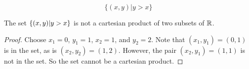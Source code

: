 \documentclass[main.tex]{subfiles}
\begin{document}
\subproblem{}\label{10c}

\[\{(x, y) | y > x\}\]

\begin{thm}
	The set \(\{(x,y)|y > x\}\) is not a cartesian product of two
	subsets of \(\mathbb{R}\).
\end{thm}
\begin{proof}
	Choose \(x_1 = 0\), \(y_1 = 1\), \(x_2 = 1\), and \(y_2 = 2\). Note that
	\((x_1,y_1) = (0,1)\) is in the set, as is \((x_2,y_2) = (1,2)\).
	However, the pair \((x_2,y_1) = (1,1)\) is not in the set. So the set
	cannot be a cartesian product.
\end{proof}
\end{document}
